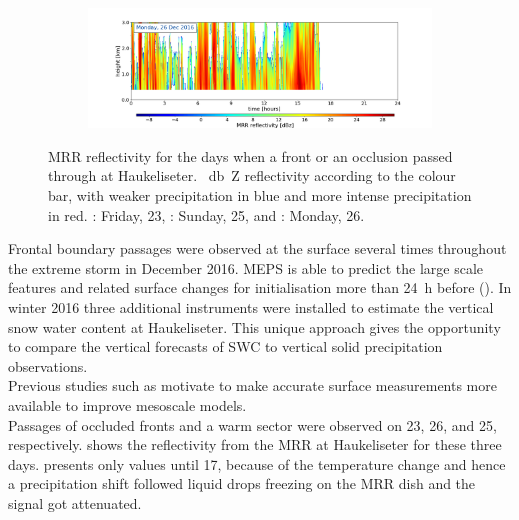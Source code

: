 \begin{figure}[h!]
	\begin{subfigure}[t]{\textwidth}
		\includegraphics[trim={6.5cm 0cm 5.3cm 15.5cm},clip,width=\textwidth]{./fig_MRR_refl/MRR_20161226}
	\end{subfigure}
	\caption{MRR reflectivity for the days when a front or an occlusion passed through at Haukeliseter. \SI{}{\decibel Z} reflectivity according to the colour bar, with weaker precipitation in blue and more intense precipitation in red. \protect{}: Friday, \SI{23}{\dec}, \protect{}: Sunday, \SI{25}{\dec}, and \protect{}: Monday, \SI{26}{\dec}.}\label{fig:ret:refl}
\end{figure}
\noindent
Frontal boundary passages were observed at the surface several times throughout the extreme storm in December 2016. MEPS is able to predict the large scale features and related surface changes for initialisation more than \SI{24}{\hour} before (). In winter 2016 three additional instruments were installed to estimate the vertical snow water content at Haukeliseter. This unique approach gives the opportunity to compare the vertical forecasts of SWC to vertical solid precipitation observations. 
\\
Previous studies such as \citet{joos_influence_2012} motivate to make accurate surface measurements more available to improve mesoscale models.
\\
Passages of occluded fronts and a warm sector were observed on \num{23}, \num{26}, and \SI{25}{\dec}, respectively.
 shows the reflectivity from the MRR at Haukeliseter for these three days.  presents only values until \SI{17}{\UTC}, because of the temperature change and hence a precipitation shift followed liquid drops freezing on the MRR dish and the signal got attenuated. 
